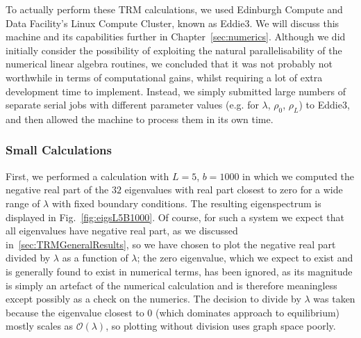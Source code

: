  To actually perform these TRM calculations, we used Edinburgh Compute and Data Facility's Linux
 Compute Cluster, known as Eddie3. We will discuss this machine and its capabilities further in
 Chapter~\ref{sec:numerics}. Although we did initially consider the possibility of exploiting the natural parallelisability of the numerical linear algebra routines, we concluded that it
 was not probably not worthwhile in terms of computational gains, whilst requiring a lot of
 extra development time to implement. Instead, we simply submitted large numbers of separate serial
 jobs with different parameter values (e.g. for $\lambda$, $\rho_0$, $\rho_L$) to Eddie3, and then
 allowed the machine to process them in its own time.
 
 \subsubsection{Small Calculations}
 First, we performed a calculation with $L=5$, $b=1000$ in which we computed the
 negative real part of the $32$ eigenvalues with real part closest to zero for a wide range of $\lambda$ with fixed
 boundary conditions. The resulting eigenspectrum is displayed in
 Fig.~\ref{fig:eigsL5B1000}.
Of course, for such a system we expect that all eigenvalues have negative real part,
as we discussed in~\ref{sec:TRMGeneralResults}, so we have chosen to plot the
negative real part divided by $\lambda$ as a function of $\lambda$; the zero eigenvalue,
which we expect to exist and is generally found to exist in numerical terms, has been ignored, as its magnitude is simply an artefact of the numerical calculation and
is therefore meaningless except possibly as a check on the numerics. The decision 
to divide by $\lambda$ was taken because the eigenvalue closest to $0$ (which dominates
approach to equilibrium) mostly scales as $\mathcal{O}(\lambda)$, so plotting without division
uses graph space poorly.

